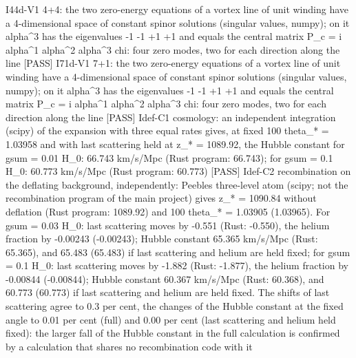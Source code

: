\documentclass[
  10pt,
]{article}
\newenvironment{Shaded}{}{}
\newcommand{\NormalTok}[1]{#1}
\begin{document}
\begin{Shaded}
\begin{Highlighting}[]
\NormalTok{[PASS] I44d{-}V1  4+4: the two zero{-}energy equations of a vortex line of unit winding have a 4{-}dimensional space of constant spinor solutions (singular values, numpy); on it alpha\^{}3 has the eigenvalues {-}1 {-}1 +1 +1 and equals the central matrix P\_c = i alpha\^{}1 alpha\^{}2 alpha\^{}3 chi: four zero modes, two for each direction along the line}
\NormalTok{[PASS] I71d{-}V1  7+1: the two zero{-}energy equations of a vortex line of unit winding have a 4{-}dimensional space of constant spinor solutions (singular values, numpy); on it alpha\^{}3 has the eigenvalues {-}1 {-}1 +1 +1 and equals the central matrix P\_c = i alpha\^{}1 alpha\^{}2 alpha\^{}3 chi: four zero modes, two for each direction along the line}
\NormalTok{[PASS] Idef{-}C1  cosmology: an independent integration (scipy) of the expansion with three equal rates gives, at fixed 100 theta\_* = 1.03958 and with last scattering held at z\_* = 1089.92, the Hubble constant for gsum = 0.01 H\_0: 66.743 km/s/Mpc (Rust program: 66.743); for gsum = 0.1 H\_0: 60.773 km/s/Mpc (Rust program: 60.773)}
\NormalTok{[PASS] Idef{-}C2  recombination on the deflating background, independently: Peebles\textquotesingle{} three{-}level atom (scipy; not the recombination program of the main project) gives z\_* = 1090.84 without deflation (Rust program: 1089.92) and 100 theta\_* = 1.03905 (1.03965). For gsum = 0.03 H\_0: last scattering moves by {-}0.551 (Rust: {-}0.550), the helium fraction by {-}0.00243 ({-}0.00243); Hubble constant 65.365 km/s/Mpc (Rust: 65.365), and 65.483 (65.483) if last scattering and helium are held fixed; for gsum = 0.1 H\_0: last scattering moves by {-}1.882 (Rust: {-}1.877), the helium fraction by {-}0.00844 ({-}0.00844); Hubble constant 60.367 km/s/Mpc (Rust: 60.368), and 60.773 (60.773) if last scattering and helium are held fixed. The shifts of last scattering agree to 0.3 per cent, the changes of the Hubble constant at the fixed angle to 0.01 per cent (full) and 0.00 per cent (last scattering and helium held fixed): the larger fall of the Hubble constant in the full calculation is confirmed by a calculation that shares no recombination code with it}

\end{Highlighting}
\end{Shaded}
\end{document}
